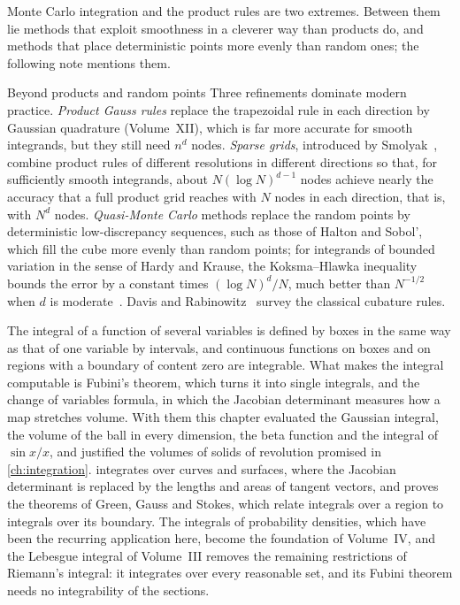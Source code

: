 Monte Carlo integration and the product rules are two extremes. Between them lie methods that exploit smoothness in a cleverer way than products do, and methods that place deterministic points more evenly than random ones; the following note mentions them.

\begin{note}{Beyond products and random points}
Three refinements dominate modern practice. \emph{Product Gauss rules} replace the trapezoidal rule in each direction by Gaussian quadrature (Volume~XII), which is far more accurate for smooth integrands, but they still need $n^d$ nodes. \emph{Sparse grids}, introduced by Smolyak~\cite{smolyak1963}, combine product rules of different resolutions in different directions so that, for sufficiently smooth integrands, about $N(\log N)^{d-1}$ nodes achieve nearly the accuracy that a full product grid reaches with $N$ nodes in each direction, that is, with $N^d$ nodes. \emph{Quasi-Monte Carlo} methods replace the random points by deterministic low-discrepancy sequences, such as those of Halton and Sobol', which fill the cube more evenly than random points; for integrands of bounded variation in the sense of Hardy and Krause, the Koksma--Hlawka inequality bounds the error by a constant times $(\log N)^d/N$, much better than $N^{-1/2}$ when $d$ is moderate~\cite{niederreiter1992}. Davis and Rabinowitz~\cite{davis1984} survey the classical cubature rules.
\end{note}

\bigskip
The integral of a function of several variables is defined by boxes in the same way as that of one variable by intervals, and continuous functions on boxes and on regions with a boundary of content zero are integrable. What makes the integral computable is Fubini's theorem, which turns it into single integrals, and the change of variables formula, in which the Jacobian determinant measures how a map stretches volume. With them this chapter evaluated the Gaussian integral, the volume of the ball in every dimension, the beta function and the integral of $\sin x/x$, and justified the volumes of solids of revolution promised in \cref{ch:integration}.  integrates over curves and surfaces, where the Jacobian determinant is replaced by the lengths and areas of tangent vectors, and proves the theorems of Green, Gauss and Stokes, which relate integrals over a region to integrals over its boundary. The integrals of probability densities, which have been the recurring application here, become the foundation of Volume~IV, and the Lebesgue integral of Volume~III removes the remaining restrictions of Riemann's integral: it integrates over every reasonable set, and its Fubini theorem needs no integrability of the sections.

